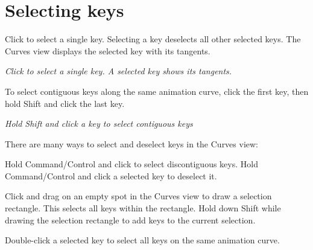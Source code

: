 \chapter{Selecting keys}
\hypertarget{md__library_2_package_cache_2com_8unity_8timeline_0d1_87_86_2_documentation_0i_2crv__keys__sel}{}\label{md__library_2_package_cache_2com_8unity_8timeline_0d1_87_86_2_documentation_0i_2crv__keys__sel}
\label{md__library_2_package_cache_2com_8unity_8timeline_0d1_87_86_2_documentation_0i_2crv__keys__sel_autotoc_md1140}%
%
 Click to select a single key. Selecting a key deselects all other selected keys. The Curves view displays the selected key with its tangents.



{\itshape Click to select a single key. A selected key shows its tangents.}

To select contiguous keys along the same animation curve, click the first key, then hold Shift and click the last key.



{\itshape Hold Shift and click a key to select contiguous keys}

There are many ways to select and deselect keys in the Curves view\+:


\begin{DoxyItemize}
\item Hold Command/\+Control and click to select discontiguous keys. Hold Command/\+Control and click a selected key to deselect it.
\item Click and drag on an empty spot in the Curves view to draw a selection rectangle. This selects all keys within the rectangle. Hold down Shift while drawing the selection rectangle to add keys to the current selection.
\item Double-\/click a selected key to select all keys on the same animation curve. 
\end{DoxyItemize}